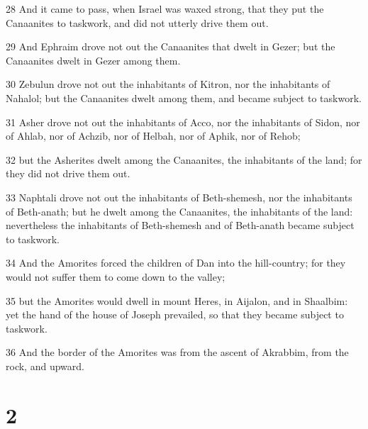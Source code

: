 \par 28 And it came to pass, when Israel was waxed strong, that they put the Canaanites to taskwork, and did not utterly drive them out.
\par 29 And Ephraim drove not out the Canaanites that dwelt in Gezer; but the Canaanites dwelt in Gezer among them.
\par 30 Zebulun drove not out the inhabitants of Kitron, nor the inhabitants of Nahalol; but the Canaanites dwelt among them, and became subject to taskwork.
\par 31 Asher drove not out the inhabitants of Acco, nor the inhabitants of Sidon, nor of Ahlab, nor of Achzib, nor of Helbah, nor of Aphik, nor of Rehob;
\par 32 but the Asherites dwelt among the Canaanites, the inhabitants of the land; for they did not drive them out.
\par 33 Naphtali drove not out the inhabitants of Beth-shemesh, nor the inhabitants of Beth-anath; but he dwelt among the Canaanites, the inhabitants of the land: nevertheless the inhabitants of Beth-shemesh and of Beth-anath became subject to taskwork.
\par 34 And the Amorites forced the children of Dan into the hill-country; for they would not suffer them to come down to the valley;
\par 35 but the Amorites would dwell in mount Heres, in Aijalon, and in Shaalbim: yet the hand of the house of Joseph prevailed, so that they became subject to taskwork.
\par 36 And the border of the Amorites was from the ascent of Akrabbim, from the rock, and upward.

\chapter{2}

